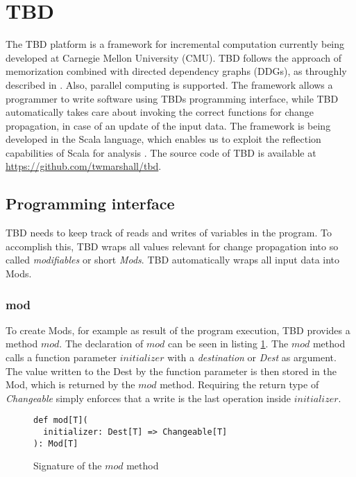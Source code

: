 \section{TBD}
\label{sec:tbd}
The TBD platform is a framework for incremental computation currently being developed at Carnegie Mellon University (CMU). TBD follows the approach of memorization combined with directed dependency graphs (DDGs), as throughly described in \cite{Acar2005thesis}. Also, parallel computing is supported. The framework allows a programmer to write software using TBDs programming interface, while TBD automatically takes care about invoking the correct functions for change propagation, in case of an update of the input data.
The framework is being developed in the Scala language, which enables us to exploit the reflection capabilities of Scala for analysis \cite{burmako2013scala} \cite{stocker2010scala}. 
The source code of TBD is available at \hyperref[]{https://github.com/twmarshall/tbd}. 

\subsection{Programming interface} 
TBD needs to keep track of reads and writes of variables in the program. To accomplish this, TBD wraps all values relevant for change propagation into so called \textit{modifiables} or short \textit{Mods}. TBD automatically wraps all input data into Mods. 

\subsubsection{mod}
To create Mods, for example as result of the program execution, TBD provides a method $mod$. The declaration of $mod$ can be seen in listing \ref{code:mod}. The $mod$ method calls a function parameter $initializer$ with a \textit{destination} or \textit{Dest} as argument. The value written to the Dest by the function parameter is then stored in the Mod, which is returned by the $mod$ method. Requiring the return type of \textit{Changeable} simply enforces that a write is the last operation inside $initializer$. 

\begin{figure}
\begin{lstlisting}[frame=single,basicstyle=\ttfamily]
def mod[T](
  initializer: Dest[T] => Changeable[T]
): Mod[T]
\end{lstlisting}
\caption{Signature of the $mod$ method}
\label{code:mod}
\end{figure}

